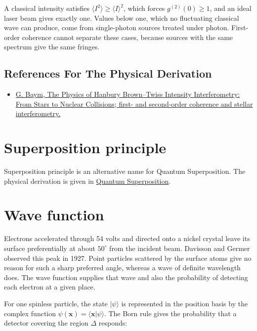 \documentclass[11pt,oneside]{book}
\newcommand{\ket}[1]{\lvert #1\rangle}
\begin{document}
A classical intensity satisfies \(\langle I^2\rangle\geq\langle I\rangle^2\), which forces \(g^{(2)}(0)\geq1\), and an ideal laser beam gives exactly one. Values below one, which no fluctuating classical wave can produce, come from single-photon sources treated under photon. First-order coherence cannot separate these cases, because sources with the same spectrum give the same fringes.

\subsection*{References For The Physical Derivation}
\begin{itemize}
\item \href{https://arxiv.org/abs/nucl-th/9804026}{G. Baym, The Physics of Hanbury Brown--Twiss Intensity Interferometry: From Stars to Nuclear Collisions; first- and second-order coherence and stellar interferometry.}
\end{itemize}





\clearpage
\section{Superposition principle}
\label{topic:superposition-principle}
Superposition principle is an alternative name for Quantum Superposition.
The physical derivation is given in \hyperref[topic:quantum-superposition]{Quantum Superposition}.

\clearpage

\section{Wave function}

\label{topic:wave-function}

Electrons accelerated through 54 volts and directed onto a nickel crystal leave its surface preferentially at about \(50^\circ\) from the incident beam. Davisson and Germer observed this peak in 1927. Point particles scattered by the surface atoms give no reason for such a sharp preferred angle, whereas a wave of definite wavelength does. The wave function supplies that wave and also the probability of detecting each electron at a given place.

For one spinless particle, the state \(\ket\psi\) is represented in the position basis by the complex function \(\psi(\mathbf x)=\langle\mathbf x|\psi\rangle\). The Born rule gives the probability that a detector covering the region \(\Delta\) responds:
\end{document}
